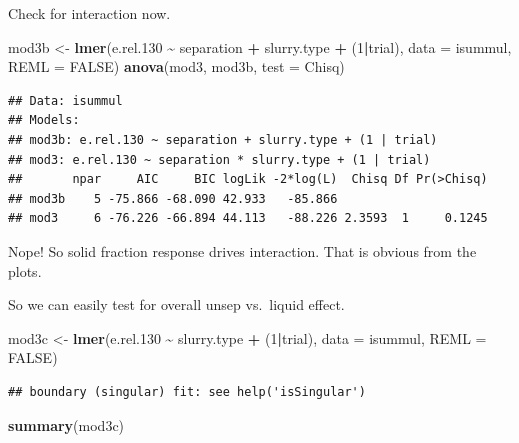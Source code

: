 \documentclass[
]{article}
\newenvironment{Shaded}{\begin{snugshade}}{\end{snugshade}}
\newcommand{\AttributeTok}[1]{\textcolor[rgb]{0.13,0.29,0.53}{#1}}
\newcommand{\ConstantTok}[1]{\textcolor[rgb]{0.56,0.35,0.01}{#1}}
\newcommand{\DecValTok}[1]{\textcolor[rgb]{0.00,0.00,0.81}{#1}}
\newcommand{\FloatTok}[1]{\textcolor[rgb]{0.00,0.00,0.81}{#1}}
\newcommand{\FunctionTok}[1]{\textcolor[rgb]{0.13,0.29,0.53}{\textbf{#1}}}
\newcommand{\NormalTok}[1]{#1}
\newcommand{\OtherTok}[1]{\textcolor[rgb]{0.56,0.35,0.01}{#1}}
\newcommand{\SpecialCharTok}[1]{\textcolor[rgb]{0.81,0.36,0.00}{\textbf{#1}}}
\newcommand{\StringTok}[1]{\textcolor[rgb]{0.31,0.60,0.02}{#1}}
\begin{document}
Check for interaction now.

\begin{Shaded}
\begin{Highlighting}[]
\NormalTok{mod3b }\OtherTok{\textless{}{-}} \FunctionTok{lmer}\NormalTok{(e.rel}\FloatTok{.130} \SpecialCharTok{\textasciitilde{}}\NormalTok{ separation }\SpecialCharTok{+}\NormalTok{ slurry.type }\SpecialCharTok{+}\NormalTok{ (}\DecValTok{1}\SpecialCharTok{|}\NormalTok{trial), }\AttributeTok{data =}\NormalTok{ isummul, }\AttributeTok{REML =} \ConstantTok{FALSE}\NormalTok{)}
\FunctionTok{anova}\NormalTok{(mod3, mod3b, }\AttributeTok{test =} \StringTok{\textquotesingle{}Chisq\textquotesingle{}}\NormalTok{)}
\end{Highlighting}
\end{Shaded}

\begin{verbatim}
## Data: isummul
## Models:
## mod3b: e.rel.130 ~ separation + slurry.type + (1 | trial)
## mod3: e.rel.130 ~ separation * slurry.type + (1 | trial)
##       npar     AIC     BIC logLik -2*log(L)  Chisq Df Pr(>Chisq)
## mod3b    5 -75.866 -68.090 42.933   -85.866                     
## mod3     6 -76.226 -66.894 44.113   -88.226 2.3593  1     0.1245
\end{verbatim}

Nope! So solid fraction response drives interaction. That is obvious
from the plots.

So we can easily test for overall unsep vs.~liquid effect.

\begin{Shaded}
\begin{Highlighting}[]
\NormalTok{mod3c }\OtherTok{\textless{}{-}} \FunctionTok{lmer}\NormalTok{(e.rel}\FloatTok{.130} \SpecialCharTok{\textasciitilde{}}\NormalTok{ slurry.type }\SpecialCharTok{+}\NormalTok{ (}\DecValTok{1}\SpecialCharTok{|}\NormalTok{trial), }\AttributeTok{data =}\NormalTok{ isummul, }\AttributeTok{REML =} \ConstantTok{FALSE}\NormalTok{)}
\end{Highlighting}
\end{Shaded}

\begin{verbatim}
## boundary (singular) fit: see help('isSingular')
\end{verbatim}

\begin{Shaded}
\begin{Highlighting}[]
\FunctionTok{summary}\NormalTok{(mod3c)}
\end{Highlighting}
\end{Shaded}
\end{document}
